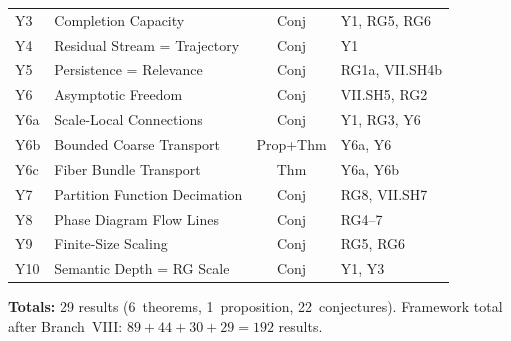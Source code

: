 \documentclass[11pt,letterpaper]{article}
\begin{document}
\begin{center}
\begin{tabular}{llcl}
Y3 & Completion Capacity & Conj 
& Y1, RG5, RG6 \\
Y4 & Residual Stream = Trajectory & Conj 
& Y1 \\
Y5 & Persistence = Relevance & Conj 
& RG1a, VII.SH4b \\
Y6 & Asymptotic Freedom & Conj 
& VII.SH5, RG2 \\
Y6a & Scale-Local Connections & Conj 
& Y1, RG3, Y6 \\
Y6b & Bounded Coarse Transport & Prop+Thm 
& Y6a, Y6 \\
Y6c & Fiber Bundle Transport & Thm 
& Y6a, Y6b \\
Y7 & Partition Function Decimation & Conj 
& RG8, VII.SH7 \\
Y8 & Phase Diagram Flow Lines & Conj 
& RG4--7 \\
Y9 & Finite-Size Scaling & Conj 
& RG5, RG6 \\
Y10 & Semantic Depth = RG Scale & Conj 
& Y1, Y3 \\
\end{tabular}
\end{center}

\medskip\noindent
\textbf{Totals:} 29 results (6~theorems, 1~proposition, 22~conjectures). 
Framework total after Branch~VIII: $89 + 44 + 30 + 29 = 192$ 
results.
\end{document}
